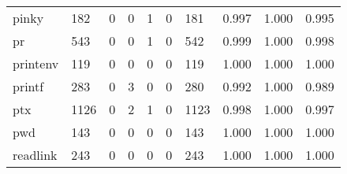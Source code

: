 \begin{longtable}{lp{2.0cm}p{2.0cm}p{2.0cm}p{2.0cm}p{2.0cm}p{2.0cm}p{2.0cm}p{2.0cm}p{2.0cm}}
pinky     &                    182 &                                  0 &                                 0 &                                1 &                                 0 &                             181 &                                   0.997 &                                  1.000 &                                0.995 \\
pr        &                    543 &                                  0 &                                 0 &                                1 &                                 0 &                             542 &                                   0.999 &                                  1.000 &                                0.998 \\
printenv  &                    119 &                                  0 &                                 0 &                                0 &                                 0 &                             119 &                                   1.000 &                                  1.000 &                                1.000 \\
printf    &                    283 &                                  0 &                                 3 &                                0 &                                 0 &                             280 &                                   0.992 &                                  1.000 &                                0.989 \\
ptx       &                   1126 &                                  0 &                                 2 &                                1 &                                 0 &                            1123 &                                   0.998 &                                  1.000 &                                0.997 \\
pwd       &                    143 &                                  0 &                                 0 &                                0 &                                 0 &                             143 &                                   1.000 &                                  1.000 &                                1.000 \\
readlink  &                    243 &                                  0 &                                 0 &                                0 &                                 0 &                             243 &                                   1.000 &                                  1.000 &                                1.000 \\

\end{longtable}
